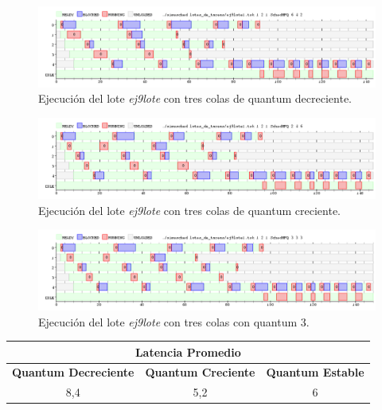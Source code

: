 \begin{figure}[!h]
	\begin{center}
		\includegraphics[width=500px]{imagenes/ej9_1.png}
		\caption{Ejecución del lote \emph{ej9lote} con tres colas de quantum decreciente.}
		\label{fig:grafico_ej9_1}
	\end{center}
\end{figure}

\begin{figure}[!h]
	\begin{center}
		\includegraphics[width=500px]{imagenes/ej9_2.png}
		\caption{Ejecución del lote \emph{ej9lote} con tres colas de quantum creciente.}
		\label{fig:grafico_ej9_2}
	\end{center}
\end{figure}

\begin{figure}[!h]
	\begin{center}
		\includegraphics[width=500px]{imagenes/ej9_3.png}
		\caption{Ejecución del lote \emph{ej9lote} con tres colas con quantum 3.}
		\label{fig:grafico_ej9_3}
	\end{center}
\end{figure}

\begin{center}
	\begin{tabular}{|c|c|c|}
		\hline
		\multicolumn{3}{|c|}{\large{\textbf{Latencia Promedio}}} \\
		\hline
		\textbf{Quantum Decreciente} & \textbf{Quantum Creciente} & \textbf{Quantum Estable} \\
		\hline
		8,4 & 5,2 & 6 \\
		\hline
	\end{tabular}
\end{center}

